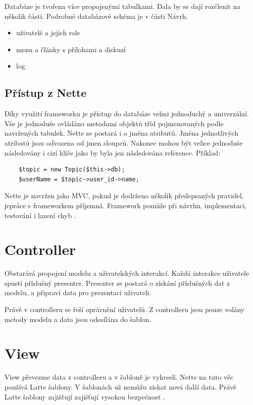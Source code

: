 \documentclass[thesis=B,czech]{FITthesis}[2012/06/26]
\begin{document}
Databáze je tvořena více propojenými tabulkami. Dala by se dají rozčlenit na několik částí. Podrobné databázové schéma je v části Návrh.
\begin{itemize}
	\item uživatelé a jejich role
	\item menu a články s přílohami a diskuzí
	\item log
\end{itemize}

\subsection{Přístup z Nette}

Díky využití frameworku je přístup do databáze velmi jednoduchý a univerzální. Vše je jednoduše ovládáno metodami objektů tříd pojmenovaných podle navržených tabulek. Nette se postará i o jména atributů. Jména jednotlivých atributů jsou odvozena od jmen sloupců. Nakonec mohou být velice jednoduše následovány i cizí klíče jako by byla jen následována reference. Příklad:

\begin{verbatim}
	$topic = new Topic($this->db);
	$userName = $topic->user_id->name;
\end{verbatim}

Nette je navržen jako MVC, pokud je dodrženo několik předepsaných pravidel, jepráce s frameworkem příjemná. Framework pomůže při návrhu, implementaci, testování i lazení chyb \cite{nette}.

\section{Controller}
Obstarává propojení modelu a uživatelských interakcí. Každá interakce uživatele spustí příslušný presenter. Presenter se postará o získání příslušných dat z modelu, a připraví data pro prezentaci uživateli.

Právě v controlleru se řeší oprávnění uživatelů. Z controlleru jsou pouze volány metody modelu a data jsou odesílána do šablon.

\section{View}

View převezme data z controlleru a v šabloně je vykreslí. Nette na tuto věc používá Latte šablony. V šablonách už nemůžu získat nová další data. Právě Latte šablony zajišťují zajišťují vysokou bezpečnost \cite{phpfashion}.
\end{document}
